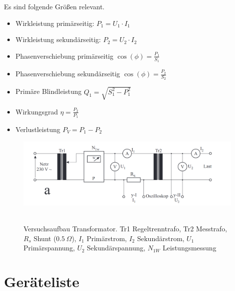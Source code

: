 \documentclass{article}
\begin{document}
Es sind folgende Größen relevant.
\begin{itemize}
\item Wirkleistung primärseitig: $P_1 = U_1\cdot I_1$
\item Wirkleistung sekundärseitig: $P_2 = U_2\cdot I_2$
\item Phasenverschiebung primärseitig $\cos(\phi) = \frac{P_1}{S_1}$
\item Phasenverschiebung sekundärseitig $\cos(\phi) = \frac{P_2}{S_2}$
\item Primäre Blindleistung $Q_1 = \sqrt{S_1^2 - P_1^2}$
\item Wirkungsgrad $\eta = \frac{P_2}{P_1}$
\item Verlustleistung $P_V = P_1 - P_2$
\end{itemize}





\begin{figure}[H]
\caption{Versuchsaufbau Transformator. Tr1 Regeltrenntrafo, Tr2 Messtrafo, $R_s$ Shunt ($0.5~\Omega$), $I_1$ Primärstrom, $I_2$ Sekundärstrom, $U_1$ Primärspannung, $U_2$ Sekundärspannung, $N_{1W}$ Leistungsmessung}
\label{fig:pic1}
{\centering
\includegraphics[scale=0.9]{pic1.png}
~
}
\end{figure}



\section{Geräteliste}
\end{document}

